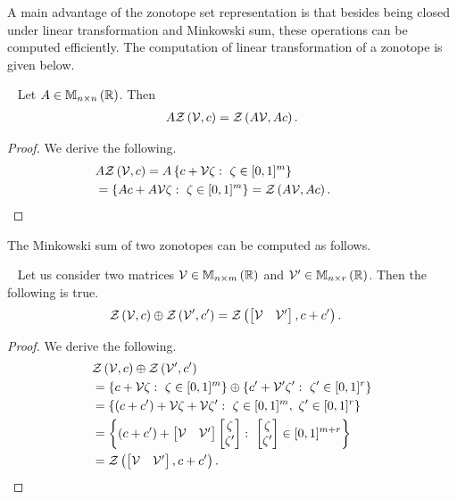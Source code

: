 A main advantage of the zonotope set representation is that besides
being closed under linear transformation and Minkowski sum, these
operations can be computed efficiently.  The computation of linear
transformation of a zonotope is given below.
%
\begin{lemma}~\label{lem:lin-rz}
Let $A\in\mathbb{M}_{n\times n}\left(\mathbb{R}\right)$.  Then
%
\begin{align*}
A\mathit{\mathcal{Z}}\left(\mathcal{V},c\right)=\mathit{\mathcal{Z}}\left(A\mathcal{V},Ac\right).
\end{align*}
%
\end{lemma} 
%
\begin{proof}
We derive the following.
%
\begin{align*}
&
  A\mathit{\mathcal{Z}}\left(\mathcal{V},c\right)=A\left\{c+\mathcal{V}\zeta:~\zeta\in[0,1]^m\right\}\\
& = \left\{Ac+A\mathcal{V}\zeta:~\zeta\in[0,1]^m\right\}=\mathit{\mathcal{Z}}\left(A\mathcal{V},Ac\right).\hspace{3em}\qedhere
\end{align*}
%
\end{proof}
%
The Minkowski sum of two zonotopes can be computed as follows.
%
\begin{lemma}~\label{lem:min-rz}
Let us consider two matrices $\mathcal{V}\in\mathbb{M}_{n\times m}\left(\mathbb{R}\right)$ and
$\mathcal{V}^\prime\in\mathbb{M}_{n\times r}\left(\mathbb{R}\right)$.  Then the following is true.
%
\begin{align*}
& \mathit{\mathcal{Z}}\left(\mathcal{V},c\right)\oplus\mathit{\mathcal{Z}}\left(\mathcal{V}^\prime,c^\prime\right)
= \mathit{\mathcal{Z}}\left(\left[\begin{matrix}\mathcal{V} & \mathcal{V}^\prime\end{matrix}\right],c+c^\prime\right).  
\end{align*}
%
\end{lemma}
%
\begin{proof}
We derive the following.
%
\begin{align*}
& \mathit{\mathcal{Z}}\left(\mathcal{V},c\right)\oplus\mathit{\mathcal{Z}}\left(\mathcal{V}^\prime,c^\prime\right)\\
& = \left\{c+\mathcal{V}\zeta:~\zeta\in[0,1]^m\right\}\oplus\left\{c^\prime+\mathcal{V}^\prime\zeta^\prime:~\zeta^\prime\in[0,1]^r\right\}\\
& =
  \left\{\left(c+c^\prime\right)+\mathcal{V}\zeta+\mathcal{V}\zeta^\prime:~\zeta\in[0,1]^m,~\zeta^\prime\in[0,1]^r\right\}\\
& = \left\{\left(c+c^\prime\right)+\left[\begin{matrix}\mathcal{V}
      &\mathcal{V}^\prime\end{matrix}\right]\left[\begin{matrix}\zeta\\\zeta^\prime\end{matrix}\right]:~{\left[\begin{matrix}\zeta\\\zeta^\prime\end{matrix}\right]}\in[0,1]^{m+r}\right\}\\
& =  \mathit{\mathcal{Z}}\left(\left[\begin{matrix}\mathcal{V} & \mathcal{V}^\prime\end{matrix}\right],c+c^\prime\right).\hspace{3em}\qedhere
\end{align*}
%
\end{proof}

